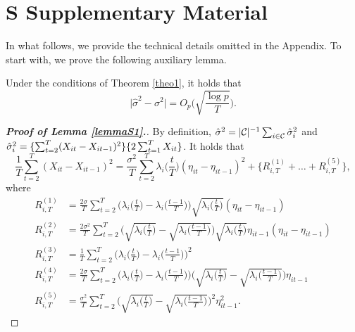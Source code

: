 \documentclass[a4paper,12pt]{article}
\numberwithin{equation}{section}
\begin{document}
\newpage
\section*{S \hspace{0.2cm} Supplementary Material}
\def\theequation{S.\arabic{equation}}
\setcounter{equation}{0}


In what follows, we provide the technical details omitted in the Appendix. To start with, we prove the following auxiliary lemma.
\begin{lemmaS}\label{lemmaS1}
Under the conditions of Theorem \ref{theo1}, it holds that 
\[ \big| \hat{\sigma}^2 - \sigma^2 \big| = O_p\Big( \sqrt{\frac{\log p}{T}} \Big). \]
\end{lemmaS} 


\begin{proof}[\textnormal{\textbf{Proof of Lemma \ref{lemmaS1}.}}]
By definition, $\hat{\sigma}^2 = |\mathcal{C}|^{-1} \sum_{i \in \mathcal{C}} \hat{\sigma}_i^2$ and $\hat{\sigma}_i^2 = \{\sum_{t=2}^T (X_{it}-X_{it-1})^2\}\{2 \sum_{t=1}^T X_{it}\}$. It holds that 
\begin{equation}\label{eq:approxerror:claim3:expansion}
\frac{1}{T} \sum\limits_{t=2}^T (X_{it} - X_{it-1})^2 = \frac{\sigma^2}{T} \sum\limits_{t=2}^T \lambda_i\Big(\frac{t}{T}\Big) (\eta_{it} - \eta_{it-1})^2 + \big\{R_{i,T}^{(1)} + \ldots + R_{i,T}^{(5)}\big\},
\end{equation}
where
\begin{align*}
R_{i,T}^{(1)} & = \frac{2\sigma}{T} \sum\limits_{t=2}^T \Big( \lambda_i\Big(\frac{t}{T}\Big) - \lambda_i\Big(\frac{t-1}{T}\Big) \Big) \sqrt{\lambda_i\Big(\frac{t}{T}\Big)} (\eta_{it} - \eta_{it-1}) \\
R_{i,T}^{(2)} & = \frac{2\sigma^2}{T} \sum\limits_{t=2}^T \Big( \sqrt{\lambda_i\Big(\frac{t}{T}\Big)} - \sqrt{\lambda_i\Big(\frac{t-1}{T}\Big)} \Big) \sqrt{\lambda_i\Big(\frac{t}{T}\Big)} \eta_{it-1} (\eta_{it} - \eta_{it-1}) \\
R_{i,T}^{(3)} & = \frac{1}{T} \sum\limits_{t=2}^T \Big( \lambda_i\Big(\frac{t}{T}\Big) - \lambda_i\Big(\frac{t-1}{T}\Big) \Big)^2 \\
R_{i,T}^{(4)} & = \frac{2 \sigma}{T} \sum\limits_{t=2}^T \Big( \lambda_i\Big(\frac{t}{T}\Big) - \lambda_i\Big(\frac{t-1}{T}\Big) \Big) \Big( \sqrt{\lambda_i\Big(\frac{t}{T}\Big)} - \sqrt{\lambda_i\Big(\frac{t-1}{T}\Big)} \Big) \eta_{it-1} \\
R_{i,T}^{(5)} & = \frac{\sigma^2}{T} \sum\limits_{t=2}^T  \Big( \sqrt{\lambda_i\Big(\frac{t}{T}\Big)} - \sqrt{\lambda_i\Big(\frac{t-1}{T}\Big)} \Big)^2 \eta_{it-1}^2.

\end{align*}
\end{proof}
\end{document}
